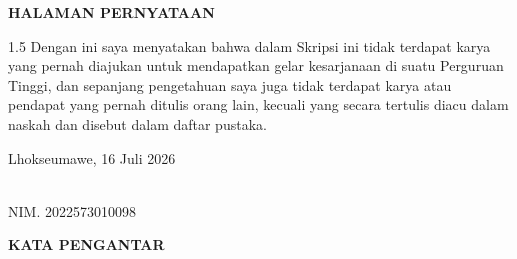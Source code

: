 \documentclass[12pt, a4paper, onecolumn, oneside]{report}
\begin{document}
\newpage



\newpage
{}
{}
\begin{center}
{\fontsize{14pt}{16pt}\selectfont\bfseries HALAMAN PERNYATAAN}
\end{center}
\vspace{0.5cm}

\begin{spacing}{1.5}
\noindent Dengan ini saya menyatakan bahwa dalam Skripsi ini tidak terdapat karya yang pernah diajukan untuk mendapatkan gelar kesarjanaan di suatu Perguruan Tinggi, dan sepanjang pengetahuan saya juga tidak terdapat karya atau pendapat yang pernah ditulis orang lain, kecuali yang secara tertulis diacu dalam naskah dan disebut dalam daftar pustaka.

\vspace{3cm}

\begin{flushright}
\begin{minipage}{5cm}
Lhokseumawe, 16 Juli 2026

\vspace{2cm}

\\
NIM. 2022573010098
\end{minipage}
\end{flushright}
\end{spacing}

\newpage
{}
{}
\begin{center}
{\fontsize{14pt}{16pt}\selectfont\bfseries KATA PENGANTAR}
\end{center}
\vspace{0.5cm}
\end{document}
